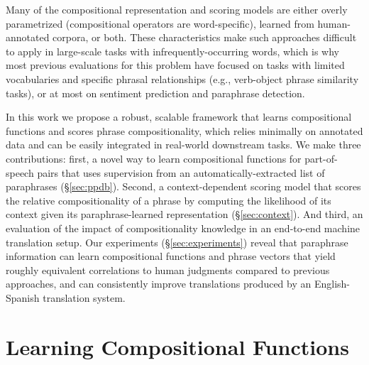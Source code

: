 \documentclass[11pt,letterpaper]{article}
\begin{document}
Many of the compositional representation and scoring models are either overly parametrized (compositional operators are word-specific), learned from human-annotated corpora, or both. 
These characteristics make such approaches difficult to apply in large-scale tasks with infrequently-occurring words, which is why most previous evaluations for this problem have focused on tasks with limited vocabularies and specific phrasal relationships (e.g., verb-object phrase similarity tasks), or at most on sentiment prediction and paraphrase detection. 

In this work we propose a robust, scalable framework that learns compositional functions and scores phrase compositionality, which relies minimally on annotated data and can be easily integrated in real-world downstream tasks. 
We make three contributions: first, a novel way to learn compositional functions for part-of-speech pairs that uses supervision from an automatically-extracted list of paraphrases (\S\ref{sec:ppdb}). 
Second, a context-dependent scoring model that scores the relative compositionality of a phrase by computing the likelihood of its context given its paraphrase-learned representation (\S\ref{sec:context}). 
And third, an evaluation of the impact of compositionality knowledge in an end-to-end machine translation setup.
Our experiments (\S\ref{sec:experiments}) reveal that paraphrase information can learn compositional functions and phrase vectors that yield roughly equivalent correlations to human judgments compared to previous approaches, and can consistently improve translations produced by an English-Spanish translation system. 

\section{Learning Compositional Functions}
\label{sec:learning}
\end{document}
